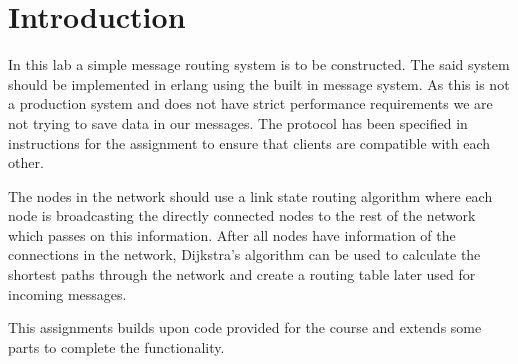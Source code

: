 \chapter{Introduction} 
\label{chap_Intro}

In this lab a simple message routing system is to be constructed. The said system should be implemented in erlang using the built in message system. As this is not a production system and does not have strict performance requirements we are not trying to save data in our messages. The protocol has been specified in instructions for the assignment to ensure that clients are compatible with each other.

The nodes in the network should use a link state routing algorithm where each node is broadcasting the directly connected nodes to the rest of the network which passes on this information. After all nodes have information of the connections in the network, Dijkstra's algorithm can be used to calculate the shortest paths through the network and create a routing table later used for incoming messages.

This assignments builds upon code provided for the course and extends some parts to complete the functionality.	







